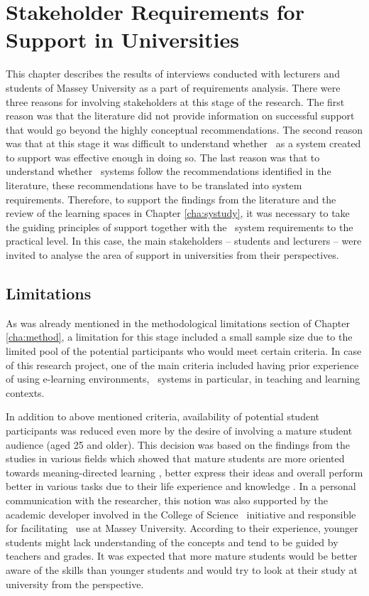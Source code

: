 \chapter[Stakeholder Requirements for \LLLc Support ]{Stakeholder Requirements
for \LLLc Support in Universities\label{cha:model}}
This chapter describes the results of interviews conducted with lecturers and
students of Massey University as a part of \LLLs requirements analysis. There
were three reasons for involving stakeholders at this stage of the research. The
first reason was that the literature did not provide information on successful
\LLLs support that would go beyond the highly conceptual recommendations. The
second reason was that at this stage it was difficult to understand whether
\ep~as a system created to support \LLLs was effective enough in doing so. The
last reason was that to understand whether \ep~systems follow the
recommendations identified in the literature, these recommendations have to be
translated into system requirements. Therefore, to support the findings from the
literature and the review of the learning spaces in Chapter \ref{cha:systudy},
it was necessary to take the guiding principles of \LLLs support together with
the \ep~system requirements to the practical level. In this case, the main
stakeholders -- students and lecturers -- were invited to analyse the area of
\LLLs support in universities from their perspectives.

\section{Limitations}

As was already mentioned in the methodological limitations section of Chapter
\ref{cha:method}, a limitation for this stage included a small sample size due
to the limited pool of the potential participants who would meet certain
criteria. In case of this research project, one of the main criteria included
having prior experience of using e-learning environments, \ep~systems in
particular, in teaching and learning contexts.

In addition to above mentioned criteria, availability of potential student
participants was reduced even more by the desire of involving a mature student
audience (aged 25 and older). This decision was based on the findings from the
studies in various fields which showed that mature students are more oriented
towards meaning-directed learning \citep{Smith2010}, better express their ideas
\citep{Lea2010} and overall perform better in various tasks due to their life
experience and knowledge \citep{Sherwood1987}. In a personal communication with
the researcher, this notion was also supported by the academic developer
involved in the College of Science \ep~initiative and responsible for
facilitating \ep~use at Massey University. According to their experience,
younger students might lack understanding of the \LLLs concepts and tend to be
guided by teachers and grades. It was expected that more mature students would
be better aware of the \LLLs skills than younger students and would try to look
at their study at university from the \LLLs perspective.

